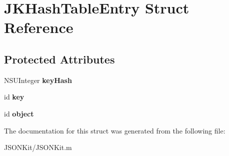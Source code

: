 \hypertarget{struct_j_k_hash_table_entry}{\section{J\+K\+Hash\+Table\+Entry Struct Reference}
\label{struct_j_k_hash_table_entry}
}
\subsection*{Protected Attributes}
\begin{DoxyCompactItemize}
\item 
\hypertarget{struct_j_k_hash_table_entry_a3627d1eea6b9d771b73d460d110a125a}{N\+S\+U\+Integer {\bfseries key\+Hash}}\label{struct_j_k_hash_table_entry_a3627d1eea6b9d771b73d460d110a125a}

\item 
\hypertarget{struct_j_k_hash_table_entry_a14459841f0c97cce172556d8338234bd}{id {\bfseries key}}\label{struct_j_k_hash_table_entry_a14459841f0c97cce172556d8338234bd}

\item 
\hypertarget{struct_j_k_hash_table_entry_a47f523fa961c85cbb5df375b802b8316}{id {\bfseries object}}\label{struct_j_k_hash_table_entry_a47f523fa961c85cbb5df375b802b8316}

\end{DoxyCompactItemize}


The documentation for this struct was generated from the following file\+:\begin{DoxyCompactItemize}
\item 
J\+S\+O\+N\+Kit/J\+S\+O\+N\+Kit.\+m\end{DoxyCompactItemize}
